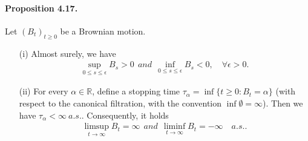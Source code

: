 \documentclass{article}
\numberwithin{equation}{section}
\theoremstyle{plain}
\theoremstyle{definition}
\begin{document}
\paragraph{Proposition 4.17.\label{prop:4.17}}  Let $(B_t)_{t\geq 0}$ be a Brownian motion.
\begin{itemize}
\item[(i)] Almost surely, we have
\begin{align*}
	\sup_{0\leq s\leq\epsilon} B_s>0\ \ \textit{and}\ \ \inf_{0\leq s\leq\epsilon} B_s<0,\quad \forall\epsilon>0.
\end{align*}
\item[(ii)] For every $\alpha\in\mathbb{R}$, define a stopping time $\tau_\alpha=\inf\{t\geq 0:B_t=\alpha\}$ (with respect to the canonical filtration, with the convention $\inf\emptyset=\infty$). Then we have $\tau_\alpha<\infty\ a.s.$. Consequently, it holds
\begin{align*}
	\limsup_{t\to\infty} B_t=\infty\ \ \textit{and}\ \  \liminf_{t\to\infty} B_t=-\infty\quad a.s..
\end{align*}
\end{itemize}
\end{document}
